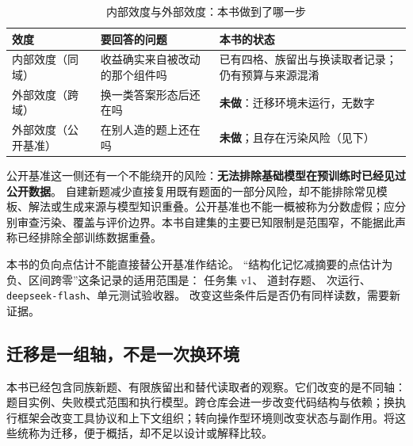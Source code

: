 \begin{table}[htbp]
\centering
\caption{内部效度与外部效度：本书做到了哪一步}
\label{tab:ch15-validity}
\begin{footnotesize}
\begin{tabular}{>{\raggedright\arraybackslash}p{2.6cm}>{\raggedright\arraybackslash}p{4.4cm}>{\raggedright\arraybackslash}p{4.4cm}}
\toprule
效度 & 要回答的问题 & 本书的状态 \\
\midrule
内部效度（同域） & 收益确实来自被改动的那个组件吗 & 已有四格、族留出与换读取者记录；仍有预算与来源混淆 \\
\midrule
外部效度（跨域） & 换一类答案形态后还在吗 & \textbf{未做}：迁移环境未运行，无数字 \\
\midrule
外部效度（公开基准） & 在别人造的题上还在吗 & \textbf{未做}；且存在污染风险（见下） \\
\bottomrule
\end{tabular}
\end{footnotesize}
\end{table}

\begin{sloppypar}
公开基准这一侧还有一个不能绕开的风险：\textbf{无法排除基础模型在预训练时已经见过公开数据}。
自建新题减少直接复用既有题面的一部分风险，却不能排除常见模板、解法或生成来源与模型知识重叠。公开基准也不能一概被称为分数虚假；应分别审查污染、覆盖与评价边界。本书自建集的主要已知限制是范围窄，不能据此声称已经排除全部训练数据重叠。
\end{sloppypar}

\begin{pitfallbox}
本书的负向点估计不能直接替公开基准作结论。
“结构化记忆减摘要的点估计为负、区间跨零”这条记录的适用范围是：
任务集 v1、 道封存题、 次运行、\texttt{deepseek-flash}、单元测试验收器。
改变这些条件后是否仍有同样读数，需要新证据。
\end{pitfallbox}

\subsection{迁移是一组轴，不是一次换环境}
\label{sec:ch15-transferaxes}

本书已经包含同族新题、有限族留出和替代读取者的观察。它们改变的是不同轴：题目实例、失败模式范围和执行模型。跨仓库会进一步改变代码结构与依赖；换执行框架会改变工具协议和上下文组织；转向操作型环境则改变状态与副作用。将这些统称为迁移，便于概括，却不足以设计或解释比较。

